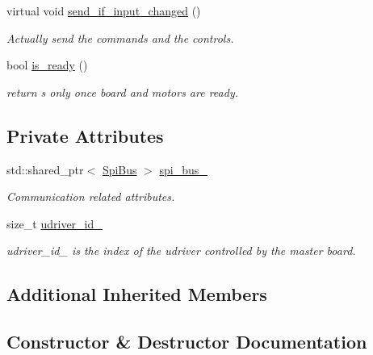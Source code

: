 \begin{DoxyCompactItemize}
virtual void \hyperlink{classblmc__drivers_1_1SpiMotorBoard_a39e986b4df42867f8d5896c35c7c4464}{send\+\_\+if\+\_\+input\+\_\+changed} ()
\begin{DoxyCompactList}\small\item\em Actually send the commands and the controls. \end{DoxyCompactList}\item 
bool \hyperlink{classblmc__drivers_1_1SpiMotorBoard_aebd1424f4bee236b2e2ca3bbb1dd8f93}{is\+\_\+ready} ()\hypertarget{classblmc__drivers_1_1SpiMotorBoard_aebd1424f4bee236b2e2ca3bbb1dd8f93}{}\label{classblmc__drivers_1_1SpiMotorBoard_aebd1424f4bee236b2e2ca3bbb1dd8f93}

\begin{DoxyCompactList}\small\item\em return s only once board and motors are ready. \end{DoxyCompactList}\end{DoxyCompactItemize}
\subsection*{Private Attributes}
\begin{DoxyCompactItemize}
\item 
std\+::shared\+\_\+ptr$<$ \hyperlink{classblmc__drivers_1_1SpiBus}{Spi\+Bus} $>$ \hyperlink{classblmc__drivers_1_1SpiMotorBoard_a767abb6f687ed8bf7fef873ab892eaf7}{spi\+\_\+bus\+\_\+}
\begin{DoxyCompactList}\small\item\em Communication related attributes. \end{DoxyCompactList}\item 
size\+\_\+t \hyperlink{classblmc__drivers_1_1SpiMotorBoard_a4b865479722dbecec8ebb66d6b93ecae}{udriver\+\_\+id\+\_\+}
\begin{DoxyCompactList}\small\item\em udriver\+\_\+id\+\_\+ is the index of the udriver controlled by the master board. \end{DoxyCompactList}\end{DoxyCompactItemize}
\subsection*{Additional Inherited Members}


\subsection{Constructor \& Destructor Documentation}
